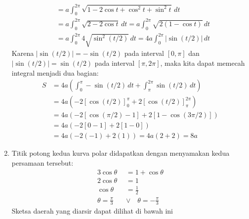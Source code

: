 \documentclass[11pt,openany,a4paper]{article}
\begin{document}
\begin{enumerate}
\begin{align*}
            &= a\int_{0}^{2\pi} \sqrt{1 - 2\cos t + \cos^2 t + \sin^2 t} \, dt\\
            &= a\int_{0}^{2\pi} \sqrt{2 - 2\cos t} \, dt = a\int_{0}^{2\pi} \sqrt{2(1 - \cos t)} \, dt\\
            &= a\int_{0}^{2\pi} 4\sqrt{\sin^2(t/2)}\, dt= 4a\int_{0}^{2\pi} |\sin(t/2)|\, dt
        \end{align*}
        Karena \( |\sin(t/2)| = -\sin(t/2) \) pada interval \( [0,\pi] \) dan \( |\sin(t/2)| = \sin(t/2) \) pada interval \( [\pi, 2\pi] \), maka kita dapat memecah integral menjadi dua bagian:
        \begin{align*}
            S &= 4a\left(\int_{0}^{\pi} -\sin(t/2)\, dt + \int_{\pi}^{2\pi} \sin(t/2)\, dt\right)\\
            &= 4a\left(-2[\cos(t/2)]_{0}^{\pi} + 2[\cos(t/2)]_{\pi}^{2\pi}\right)\\
            &= 4a(-2[\cos(\pi/2)-1] + 2[1-\cos(3\pi/2)])\\
            &= 4a(-2[0-1] + 2[1-0])\\
            &= 4a(-2(-1) + 2(1)) = 4a(2 + 2) = \boxed{8a}
        \end{align*}
      \item Titik potong kedua kurva polar didapatkan dengan menyamakan kedua persamaan tersebut:
        \begin{align*}
            3\cos\theta &= 1 + \cos\theta \\
            2\cos\theta &= 1 \\
            \cos\theta &= \frac{1}{2} \\
            \theta = \frac{\pi}{3} \quad&\vee\quad \theta = -\frac{\pi}{3}
        \end{align*}
        Sketsa daerah yang diarsir dapat dilihat di bawah ini
        \begin{center}
\end{center}
\end{enumerate}
\end{document}
